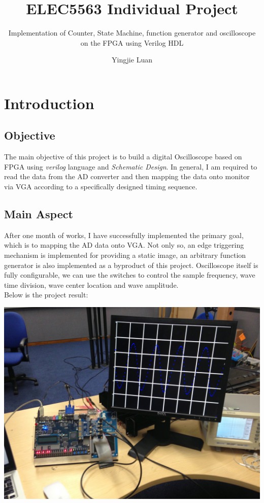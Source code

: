 \documentclass[11pt]{scrartcl}
\begin{document}
\title{ELEC5563 Individual Project}
\subtitle{ Implementation of Counter, State Machine, function generator and oscilloscope on the FPGA using Verilog HDL}
\author{Yingjie Luan}
\maketitle

\tableofcontents

\section{Introduction}
\subsection{Objective}
The main objective of this project is to build a digital Oscilloscope based on FPGA using \textit{verilog} language and \textit{Schematic Design}. In general, I am required to read the data from the AD converter and then mapping the data onto monitor via VGA according to a specifically designed timing sequence.
\subsection{Main Aspect}
After one month of works, I have successfully implemented the primary goal, which is to mapping the AD data onto VGA. Not only so, an edge triggering mechanism is implemented for providing a static image, an arbitrary function generator is also implemented as a byproduct of this project. Oscilloscope itself is fully configurable, we can use the switches to control the sample frequency, wave time division, wave center location and wave amplitude. \\

Below is the project result:

\begin{center}
\begin{minipage}[t]{\linewidth}

{
\includegraphics[scale = 0.15]{IMG_1388.JPG}
}
\end{minipage}
\medskip
\end{center}
\end{document}
